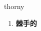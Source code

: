 
\begin{frame}
{\huge thorny}
\begin{center}
\begin{enumerate}\Large
  \item \textbf{棘手的}
\end{enumerate}
\end{center}
\end{frame}
